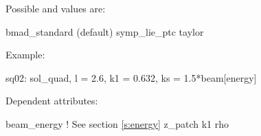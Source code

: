 \vskip0.2in \noindent
Possible  and  values are:
\vskip 0.01in
\begin{example}
  bmad\_standard  (default)
  symp\_lie\_ptc
  taylor
\end{example}

\vskip0.2in \noindent
Example:
\begin{example}
  sq02: sol_quad, l = 2.6, k1 = 0.632, ks = 1.5*beam[energy]
\end{example}

\vskip0.2in \noindent
Dependent attributes:
\begin{example}
  beam\_energy  ! See section \ref{s:energy}
  z\_patch
  k1
  rho
\end{example}
